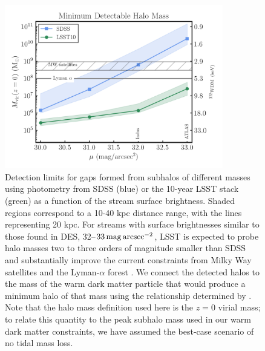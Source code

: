 \begin{figure}[t]
\centering
\includegraphics[width=0.85\textwidth]{figures/streamgap_constraints_3.png}
\caption{\label{fig:streamsurveys} Detection limits for gaps formed from subhalos of different masses using photometry from SDSS (blue) or the 10-year LSST stack (green) as a function of the stream surface brightness.
Shaded regions correspond to a 10-40 kpc distance range, with the lines representing 20 kpc. For streams with surface brightnesses similar to those found in DES, 32--$33 \mathrm{\,mag} \mathrm{\,arcsec}^{-2}$, LSST is expected to probe halo masses two to three orders of magnitude smaller than SDSS and substantially improve the current constraints from Milky Way satellites \citep{Nadler:2018, Jethwa:2018,Kim:2017iwr} and the Lyman-$\alpha$ forest \citep{2017PhRvD..96b3522I}. 
We connect the detected halos to the mass of the warm dark matter particle that would produce a minimum halo of that mass using the relationship determined by \cite{Bullock:2017xww}. Note that the halo mass definition used here is the $z=0$ virial mass; to relate this quantity to the peak subhalo mass used in our warm dark matter constraints, we have assumed the best-case scenario of no tidal mass loss.
}
\end{figure}


